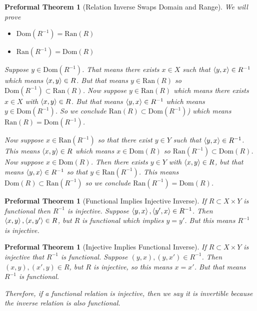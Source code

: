 \documentclass[oneside, 12pt]{book}
\theoremstyle{break}
\newtheorem{preformal definition}[definition]{Preformal Definition}
\newtheorem{preformal theorem}[theorem]{Preformal Theorem}
\begin{document}
			\begin{preformal theorem}[Relation Inverse Swaps Domain and Range]
				We will prove 
				\begin{itemize}
					\item{$\text{Dom}(R^{-1}) = \text{Ran}(R)$}
					\item{$\text{Ran}(R^{-1}) = \text{Dom}(R)$}
				\end{itemize}
				Suppose $y\in \text{Dom}(R^{-1})$.
				That means there exists $x\in X$ such that $\braket{y, x}\in R^{-1}$ which means $\braket{x, y}\in R$. But that means $y\in \text{Ran}(R)$ so $\text{Dom}(R^{-1})\subset \text{Ran}(R)$.
				Now suppose $y\in \text{Ran}(R)$ which means there exists $x\in X$ with $\braket{x, y}\in R$. 
				But that means $\braket{y, x}\in R^{-1}$ which means $y\in \text{Dom}(R^{-1})$. So we conclude $\text{Ran}(R)\subset \text{Dom}(R^{-1})$) which means $\text{Ran}(R) = \text{Dom}(R^{-1})$.
				
				Now suppose $x\in \text{Ran}(R^{-1})$ so that there exist $y\in Y$ such that $\braket{y, x}\in R^{-1}$.
				This means $\braket{x, y} \in R$ which means $x\in \text{Dom}(R)$ so $\text{Ran}(R^{-1}) \subset \text{Dom}(R)$.
				Now suppose $x\in \text{Dom}(R)$. 
				Then there exists $y\in Y$ with $\braket{x, y}\in R$, but that means $\braket{y, x}\in R^{-1}$ so that $y\in \text{Ran}(R^{-1})$.
				This means $\text{Dom}(R) \subset \text{Ran}(R^{-1})$ so we conclude $\text{Ran}(R^{-1}) = \text{Dom}(R)$.		
			\end{preformal theorem}	
			
			\begin{preformal theorem}[Functional Implies Injective Inverse]
				If $R\subset X\times Y$ is functional then $R^{-1}$ is injective.
				Suppose $\braket{y, x}, \braket{y',x}\in R^{-1}$.
				Then $\braket{x, y}, \braket{x, y'}\in R$, but $R$ is functional which implies $y=y'$. 
				But this means $R^{-1}$ is injective.
			\end{preformal theorem}
			
			\begin{preformal theorem}[Injective Implies Functional Inverse]
				If $R\subset X\times Y$ is injective that $R^{-1}$ is functional.
				Suppose $(y, x), (y, x')\in R^{-1}$.
				Then $(x, y), (x', y) \in R$, but $R$ is injective, so this means $x=x'$.
				But that means $R^{-1}$ is functional.
				
				Therefore, if a functional relation is injective, then we say it is invertible because the inverse relation is also functional.
			\end{preformal theorem}
						
\end{document}
